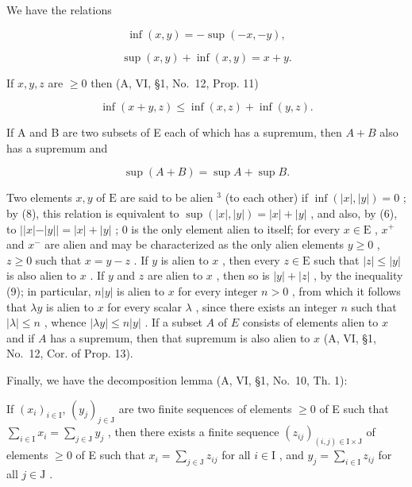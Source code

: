 We have the relations

\[
\inf (x, y) = - \sup (- x, - y),\tag{7}
\]

\[
\sup (x, y) + \inf (x, y) = x + y.\tag{8}
\]

If \(x, y, z\) are \(\geqslant 0\) then (A, VI, §1, No.~12, Prop. 11)

\[
\inf (x + y, z) \leqslant \inf (x, z) + \inf (y, z).\tag{9}
\]

If A and B are two subsets of E each of which has a supremum, then \(A + B\) also has a supremum and

\[
\sup (A + B) = \sup A + \sup B.\tag{10}
\]

Two elements \(x, y\) of \(\mathrm{E}\) are said to be alien \(^3\) (to each other) if \(\inf(|x|, |y|) = 0\) ; by (8), this relation is equivalent to \(\sup(|x|, |y|) = |x| + |y|\) , and also, by (6), to \(||x| - |y|| = |x| + |y|\) ; 0 is the only element alien to itself; for every \(x \in \mathrm{E}\) , \(x^+\) and \(x^-\) are alien and may be characterized as the only alien elements \(y \geqslant 0\) , \(z \geqslant 0\) such that \(x = y - z\) . If \(y\) is alien to \(x\) , then every \(z \in \mathrm{E}\) such that \(|z| \leqslant |y|\) is also alien to \(x\) . If \(y\) and \(z\) are alien to \(x\) , then so is \(|y| + |z|\) , by the inequality (9); in particular, \(n|y|\) is alien to \(x\) for every integer \(n > 0\) , from which it follows that \(\lambda y\) is alien to \(x\) for every scalar \(\lambda\) , since there exists an integer \(n\) such that \(|\lambda| \leqslant n\) , whence \(|\lambda y| \leqslant n|y|\) . If a subset \(A\) of \(E\) consists of elements alien to \(x\) and if \(A\) has a supremum, then that supremum is also alien to \(x\) (A, VI, §1, No.~12, Cor. of Prop. 13).

Finally, we have the decomposition lemma (A, VI, §1, No.~10, Th. 1):

If \((x_{i})_{i\in \mathrm{I}}\), \((y_{j})_{j\in \mathrm{J}}\) are two finite sequences of elements \(\geqslant 0\) of E such that \(\sum_{i\in \mathrm{I}}x_i = \sum_{j\in \mathrm{J}}y_j\) , then there exists a finite sequence \((z_{ij})_{(i,j)\in \mathrm{I}\times \mathrm{J}}\) of elements \(\geqslant 0\) of E such that \(x_{i} = \sum_{j\in \mathrm{J}}z_{ij}\) for all \(i\in \mathrm{I}\) , and \(y_{j} = \sum_{i\in \mathrm{I}}z_{ij}\) for all \(j\in \mathrm{J}\) .

